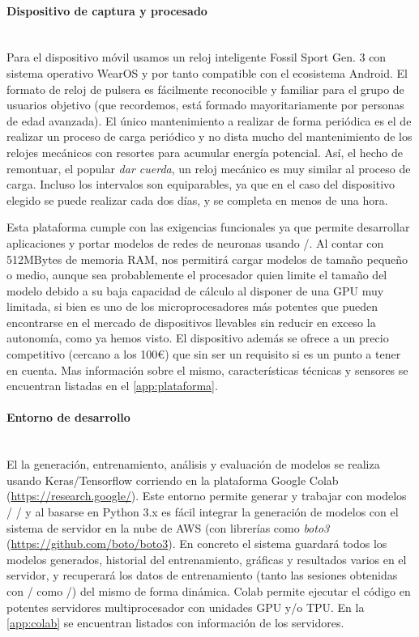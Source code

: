 \paragraph{Dispositivo de captura y procesado}\\
Para el dispositivo móvil usamos un reloj inteligente Fossil Sport Gen. 3 con sistema operativo WearOS y por tanto compatible con el ecosistema Android. El formato de reloj de pulsera es fácilmente reconocible y familiar para el grupo de usuarios objetivo (que recordemos, está formado mayoritariamente por personas de edad avanzada). El único mantenimiento a realizar de forma periódica es el de realizar un proceso de carga periódico y no dista mucho del mantenimiento de los relojes mecánicos con resortes para acumular energía potencial. Así, el hecho de remontuar, el popular \textit{dar cuerda}, un reloj mecánico es muy similar al proceso de carga. Incluso los intervalos son equiparables, ya que en el caso del dispositivo elegido se puede realizar cada dos días, y se completa en menos de una hora.

Esta plataforma cumple con las exigencias funcionales ya que permite desarrollar aplicaciones y portar modelos de redes de neuronas usando \tflite/. Al contar con 512MBytes de memoria RAM, nos permitirá cargar modelos de tamaño pequeño o medio, aunque sea probablemente el procesador quien limite el tamaño del modelo debido a su baja capacidad de cálculo al disponer de una GPU muy limitada, si bien es uno de los microprocesadores más potentes que pueden encontrarse en el mercado de dispositivos llevables sin reducir en exceso la autonomía, como ya hemos visto. El dispositivo además se ofrece a un precio competitivo (cercano a los 100€) que sin ser un requisito si es un punto a tener en cuenta. Mas información sobre el mismo, características técnicas y sensores se encuentran listadas en el \autoref{app:plataforma}.

\paragraph{Entorno de desarrollo}\\
El la generación, entrenamiento, análisis y evaluación de modelos se realiza usando Keras/Tensorflow corriendo en la plataforma Google Colab (\url{https://research.google/}). Este entorno permite generar y trabajar con modelos \tensorflow/ \tflite/ y al basarse en Python 3.x es fácil integrar la generación de modelos con el sistema de servidor en la nube de AWS (con librerías como \textit{boto3} (\url{https://github.com/boto/boto3}). En concreto el sistema guardará todos los modelos generados, historial del entrenamiento, gráficas y resultados varios en el servidor, y recuperará los datos de entrenamiento (tanto las sesiones obtenidas con \accelcapture/ como \sisfall/) del mismo de forma dinámica. Colab permite ejecutar el código en potentes servidores multiprocesador con unidades GPU y/o TPU. En la \autoref{app:colab} se encuentran listados con información de los servidores.


